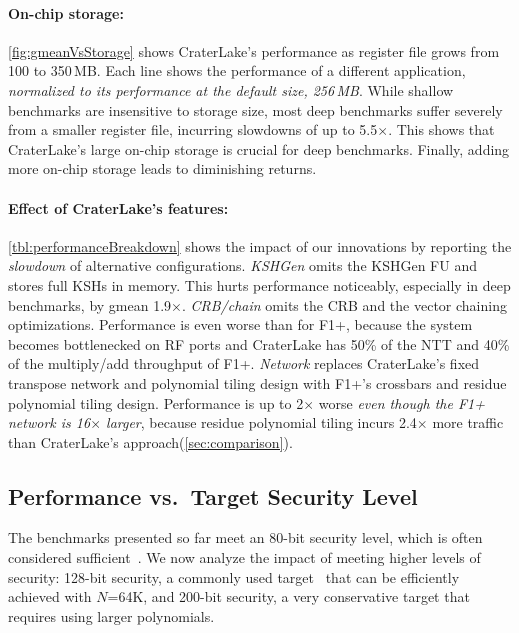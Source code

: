 \figGmeanVsStorage

\paragraph{On-chip storage:}
\autoref{fig:gmeanVsStorage} shows CraterLake's performance as register file
grows from 100 to 350\,MB. Each line shows the performance of a different
application, \emph{normalized to its performance at the default size, 256\,MB}.
While shallow benchmarks are insensitive to storage size, most deep benchmarks
suffer severely from a smaller register file, incurring slowdowns of up to
5.5$\times$. This shows that CraterLake's large on-chip storage is crucial for
deep benchmarks. Finally, adding more on-chip storage leads to diminishing
returns.


\paragraph{Effect of CraterLake's features:}
\autoref{tbl:performanceBreakdown} shows the impact of our innovations by
reporting the \emph{slowdown} of alternative configurations. \emph{KSHGen}
omits the KSHGen FU and stores full KSHs in memory. This hurts performance
noticeably, especially in deep benchmarks, by gmean 1.9$\times$.
\emph{CRB/chain} omits the CRB and the vector chaining optimizations.
Performance is even worse than for F1+, because the system becomes bottlenecked
on RF ports and CraterLake has 50\% of the NTT and 40\% of the multiply/add
throughput of F1+. \emph{Network} replaces CraterLake's fixed transpose network
and polynomial tiling design with F1+'s crossbars and residue polynomial tiling
design. Performance is up to 2$\times$ worse \emph{even though the F1+ network
is 16$\times$ larger}, because residue polynomial tiling incurs 2.4$\times$
more traffic than CraterLake's approach(\autoref{sec:comparison}).

\subsection{Performance vs.\ Target Security Level}
\label{sec:moreSecurity}

The benchmarks presented so far meet an 80-bit security level, which is often
considered
sufficient~\cite{feldmann:micro21:f1,halevi2021bootstrapping,halevi2018faster,izabachene2019practical,ji2019efficient}.
We now analyze the impact of meeting higher levels of security: 128-bit
security, a commonly used
target~\cite{albrecht:hesg18:standard,lee:2021:privacy,riazi:asplos20:heax}
that can be efficiently achieved with $N$=64K, and 200-bit security, a very
conservative target that requires using larger polynomials.

